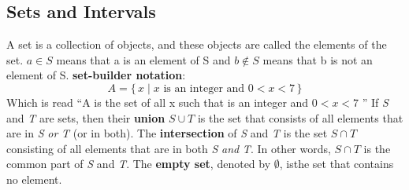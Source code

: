 \documentclass{article}
\begin{document}
\subsection*{Sets and Intervals}
A set is a collection of objects, and these objects are called the elements of the set.
$a \in S$ means that a is an element of S and $b \not\in S$ means that b is not an element of S.
\newline
\textbf{set-builder notation}:
$$A = \{\,x \mid x \mbox{ is an integer and } 0 < x < 7 \,\}$$
Which is read ``A is the set of all x such that is an integer and $0 < x < 7$ ''
\newline
If \emph{S} and \emph{T} are sets, then their \textbf{union} $S \cup T$ is the set that consists of all elements that are in \emph{S} \textit{or} \emph{T} (or in both). The \textbf{intersection} of \emph{S} and \emph{T} is the set $S \cap T$ consisting of all elements that are in both \emph{S} \textit{and} \emph{T}. In other words, $S \cap T$ is the common part of \emph{S} and \emph{T}. The \textbf{empty set}, denoted by $\emptyset$, isthe set that contains no element.
\end{document}

